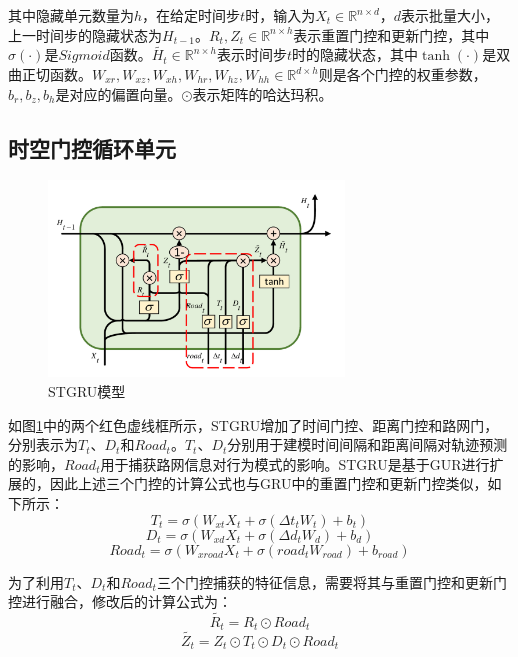 \documentclass[master]{thesis-uestc}
\begin{document}
其中隐藏单元数量为$h$，在给定时间步$t$时，输入为$X_t\in \mathbb{R}^{n\times d}$，$d$表示批量大小，上一时间步的隐藏状态为$H_{t-1}$。$R_t,Z_t \in \mathbb{R}^{n\times h}$表示重置门控和更新门控，其中$\sigma(\cdot)$是$Sigmoid$函数。$\tilde{H_t}\in \mathbb{R}^{n\times h}$表示时间步$t$时的隐藏状态，其中$\tanh(\cdot)$是双曲正切函数。$W_{xr},W_{xz},W_{xh},W_{hr},W_{hz},W_{hh} \in \mathbb{R}^{d\times h}$则是各个门控的权重参数，$b_r,b_z,b_h$是对应的偏置向量。$\odot$表示矩阵的哈达玛积。

\subsection{时空门控循环单元}

\begin{figure}[!ht]
\centering 
\includegraphics[width=0.7\textwidth]{./pic/stgru_add_box.pdf}
\caption{STGRU模型}
\label{Figure.3.3}
\end{figure}

如图\ref{Figure.3.3}中的两个红色虚线框所示，STGRU增加了时间门控、距离门控和路网门，分别表示为$T_t$、$D_t$和$Road_t$。$T_t$、$D_t$分别用于建模时间间隔和距离间隔对轨迹预测的影响，$Road_t$用于捕获路网信息对行为模式的影响。STGRU是基于GUR进行扩展的，因此上述三个门控的计算公式也与GRU中的重置门控和更新门控类似，如下所示：
\begin{equation}
  T_t=\sigma(W_{xt}X_t+\sigma(\Delta t_tW_t)+b_t)
\end{equation}
\begin{equation}
  D_t=\sigma(W_{xd}X_t+\sigma(\Delta d_tW_d)+b_d)
\end{equation}
\begin{equation}
  Road_t=\sigma(W_{xroad}X_t+\sigma(road_tW_{road})+b_{road})
\end{equation}

为了利用$T_t$、$D_t$和$Road_t$三个门控捕获的特征信息，需要将其与重置门控和更新门控进行融合，修改后的计算公式为：
\begin{equation}
  \tilde{R_t} = R_t \odot Road_t
\end{equation}
\begin{equation}
  \tilde{Z_t} = Z_t \odot T_t \odot D_t \odot Road_t
\end{equation}
\end{document}
